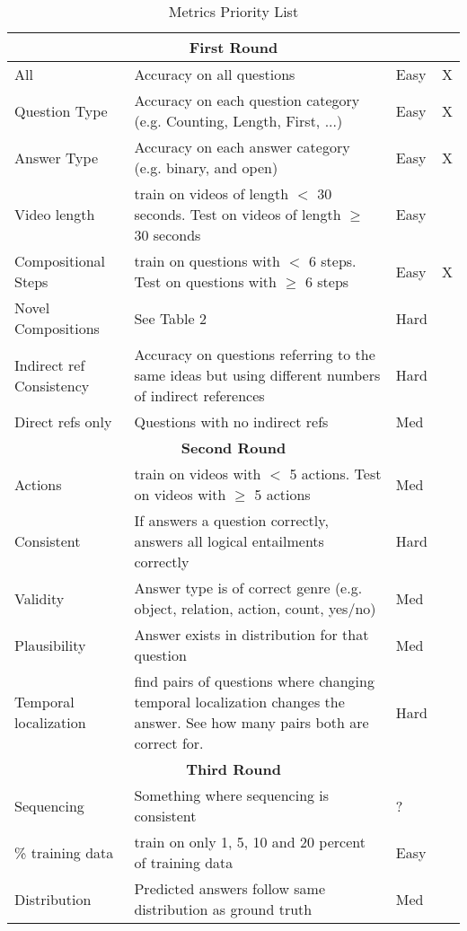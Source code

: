 \documentclass{article}
\begin{document}
\begin{table}[]
    \begin{center}
    \caption{Metrics Priority List}
    \label{tab:table1}
    \begin{tabular}{|p{2cm}|p{10cm}|p{.8cm}|p{.5cm}|}
     \hline
     \multicolumn{4}{|c|}{\textbf{First Round}}\\
    \hline
    All & Accuracy on all questions & Easy & X \\
    \hline
    Question Type & Accuracy on each question category (e.g. Counting, Length, First, ...) & Easy & X \\
    \hline
    Answer Type & Accuracy on each answer category (e.g. binary, and open) & Easy & X \\
    \hline
    Video length & train on videos of length $<$ 30 seconds. Test on videos of length $\geq$ 30 seconds & Easy &  \\
    \hline
    Compositional Steps &  train on questions with $<$ 6 steps. Test on questions with $\geq$ 6 steps & Easy & X  \\
    \hline
    Novel Compositions & See Table 2 & Hard  & \\
    \hline
    Indirect ref Consistency & Accuracy on questions referring to the same ideas but using different numbers of indirect references & Hard  & \\
    \hline
    Direct refs only & Questions with no indirect refs & Med & \\
    \hline
    
    
     \multicolumn{4}{|c|}{\textbf{Second Round}}\\
    \hline
    Actions & train on videos with $<$ 5 actions. Test on videos with $\geq$ 5 actions & Med  &  \\
    \hline
    Consistent & If answers a question correctly, answers all logical entailments correctly & Hard &  \\
    \hline
    Validity & Answer type is of correct genre (e.g. object, relation, action, count, yes/no) & Med & \\
    \hline
    Plausibility  & Answer exists in distribution for that question & Med & \\
    \hline
     Temporal localization & find pairs of questions where changing temporal localization changes the answer. See how many pairs both are correct for. & Hard  & \\
     \hline
    
    
     \multicolumn{4}{|c|}{\textbf{Third Round}}\\
    \hline
    Sequencing & Something where sequencing is consistent & ?  & \\
    \hline
    \% training data & train on only 1, 5, 10 and 20 percent of training data  & Easy & \\
    \hline
    Distribution & Predicted answers follow same distribution as ground truth & Med & \\
    \hline
    \end{tabular}
    \end{center}
\end{table}
\end{document}
